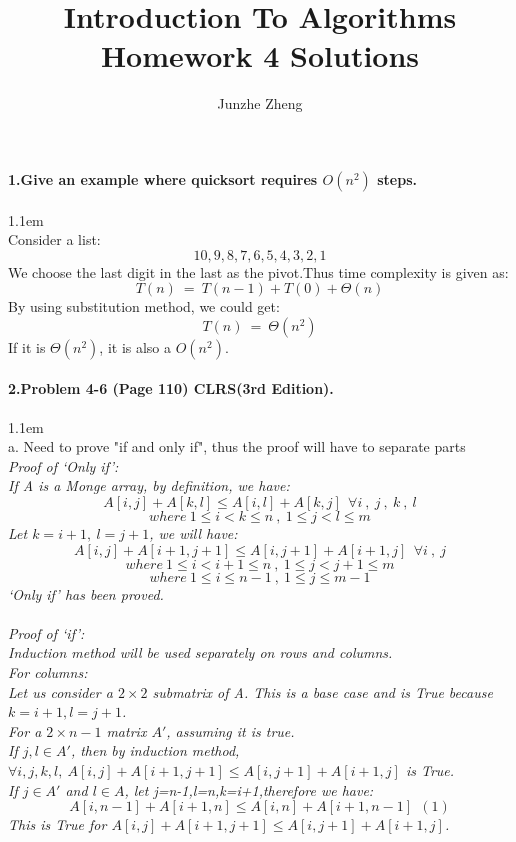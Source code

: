 \documentclass[11pt]{article}
\title{Introduction To Algorithms \\ Homework 4 Solutions}
\author{Junzhe Zheng}
\begin{document}
\maketitle

\paragraph{1.Give an example where quicksort requires $O(n^{2})$ steps.}
\hangindent 1.1em
\noindent
\\Consider a list:
\[
	10,9,8,7,6,5,4,3,2,1
\]
We choose the last digit in the last as the pivot.Thus time complexity is given as:
\[
	T(n)\ =\ T(n-1)+T(0)+\Theta(n)
\]
By using substitution method, we could get:
\[
	T(n)\ =\ \Theta(n^{2})
\]
If it is $\Theta(n^{2})$, it is also a $O(n^{2})$.
\\
\paragraph{2.Problem 4-6 (Page 110) CLRS(3rd Edition).}
\hangindent 1.1em
\noindent
\\a. Need to prove "if and only if", thus the proof will have to separate parts
\\\it{ Proof of `Only if'}\normalfont:
\\If A is a Monge array, by definition, we have:
$$A[i,j]+A[k,l]\leq A[i,l]+A[k,j]\ \ \forall i\ ,\ j\ ,\ k\ ,\ l$$
$$where\ 1\leq i<k \leq n\ ,\ 1\leq j<l\leq m$$
Let $k=i+1,\ l=j+1$, we will have:
$$A[i,j]+A[i+1,j+1]\leq A[i,j+1]+A[i+1,j]\ \ \forall i\ ,\ j$$
$$where\ 1\leq i<i+1\leq n\ ,\ 1\leq j<j+1\leq m$$
$$where\ 1\leq i\leq n-1\ ,\ 1\leq j\leq m-1$$
`Only if' has been proved.
\\
\\\it{Proof of `if'}\normalfont:
\\Induction method will be used separately on rows and columns.
\\For columns:
\\Let us consider a $2 \times 2$ submatrix  of A. This is a base case and is True because $k = i+1, l = j + 1$.
\\For a $2 \times n-1$ matrix $A'$, assuming it is true.
\\If $j,l \in A'$, then by induction method, $\forall i,j,k,l,\ A[i,j]+A[i+1,j+1]\leq A[i,j+1]+A[i+1,j]$ is True.
\\If $j\in A'$ and $l\in A$, let j=n-1,l=n,k=i+1,therefore we have:
$$A[i,n-1]+A[i+1,n]\leq A[i,n]+A[i+1,n-1]\ \ (1)$$
This is True for $A[i,j]+A[i+1,j+1]\leq A[i,j+1]+A[i+1,j]$.
\end{document}
